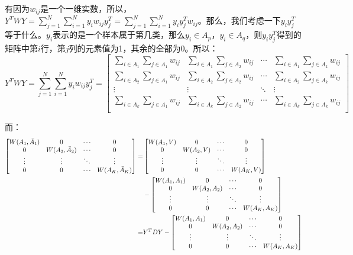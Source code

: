 \documentclass[a4paper]{article}
\begin{document}
有因为$w_{ij}$是一个一维实数，所以，$Y^TWY = \sum_{j=1}^N \sum_{i=1}^N y_iw_{ij}y_j^T = \sum_{j=1}^N \sum_{i=1}^N y_iy_j^Tw_{ij}$。那么，我们考虑一下$y_iy_j^T$等于什么。$y_i$表示的是一个样本属于第几类，那么$y_i\in A_p$，$y_i\in A_q$，则$y_iy_j^T$得到的矩阵中第$i$行，第$j$列的元素值为1，其余的全部为0。所以：
\begin{equation}
    Y^TWY = \sum_{j=1}^N \sum_{i=1}^N y_iw_{ij}y_j^T = 
    \begin{bmatrix}
    \sum_{i\in A_1}\sum_{j \in A_1} w_{ij} & \sum_{i\in A_1}\sum_{j \in A_2} w_{ij} & \cdots & \sum_{i\in A_1}\sum_{j \in A_k} w_{ij} \\
    \sum_{i\in A_2}\sum_{j \in A_1} w_{ij} & \sum_{i\in A_2}\sum_{j \in A_2} w_{ij} & \cdots & \sum_{i\in A_2}\sum_{j \in A_k} w_{ij} \\
    \vdots & \vdots & \ddots & \vdots \\
    \sum_{i\in A_k}\sum_{j \in A_1} w_{ij} & \sum_{i\in A_k}\sum_{j \in A_2} w_{ij} & \cdots & \sum_{i\in A_k}\sum_{j \in A_k} w_{ij} \\
    \end{bmatrix}
\end{equation}

而：
\begin{equation}
\begin{split}
    \begin{bmatrix}
    { W(A_1,\Bar{A}_1)} & 0 & \cdots & 0 \\
    0 &  W(A_2,\Bar{A}_2) &   \cdots & 0 \\
    \vdots & \vdots & \ddots & \vdots \\
    0 & 0  &   \cdots & { W(A_K,\Bar{A}_K)} \\
    \end{bmatrix} = & 
    \begin{bmatrix}
    { W(A_1,V)} & 0 & \cdots & 0 \\
    0 &  W(A_2,V) &   \cdots & 0 \\
    \vdots & \vdots & \ddots & \vdots \\
    0 & 0  &   \cdots & { W(A_K,V)} \\
    \end{bmatrix} \\
     & -
    \begin{bmatrix}
    { W(A_1,A_1)} & 0 & \cdots & 0 \\
    0 &  W(A_2,A_2) &   \cdots & 0 \\
    \vdots & \vdots & \ddots & \vdots \\
    0 & 0  &   \cdots & { W(A_K,A_K)} \\
    \end{bmatrix} \\
    = &  Y^TDY  - \begin{bmatrix}
    { W(A_1,A_1)} & 0 & \cdots & 0 \\
    0 &  W(A_2,A_2) &   \cdots & 0 \\
    \vdots & \vdots & \ddots & \vdots \\
    0 & 0  &   \cdots & { W(A_K,A_K)} \\
    \end{bmatrix} 
\end{split}
\end{equation}
\end{document}
